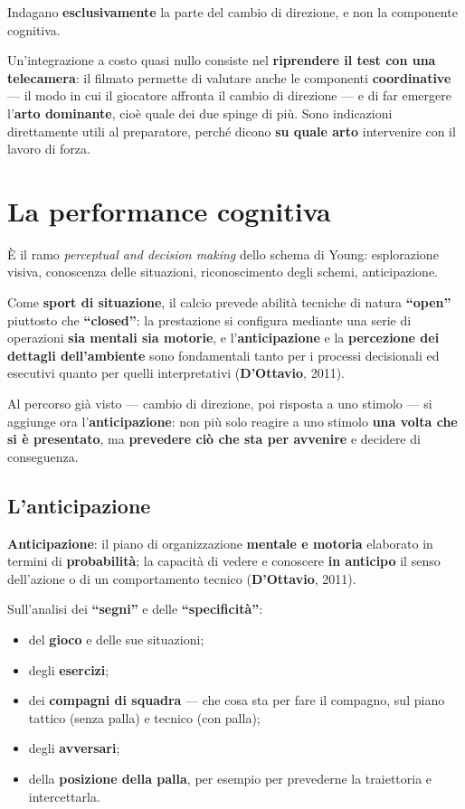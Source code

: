 Indagano \textbf{esclusivamente} la parte del cambio di direzione, e non la componente cognitiva.

Un'integrazione a costo quasi nullo consiste nel \textbf{riprendere il test con una telecamera}:
il filmato permette di valutare anche le componenti \textbf{coordinative} --- il modo in cui il
giocatore affronta il cambio di direzione --- e di far emergere l'\textbf{arto dominante}, cioè
quale dei due spinge di più. Sono indicazioni direttamente utili al preparatore, perché dicono
\textbf{su quale arto} intervenire con il lavoro di forza.

\section{La performance cognitiva}

È il ramo \textit{perceptual and decision making} dello schema di Young: esplorazione visiva,
conoscenza delle situazioni, riconoscimento degli schemi, anticipazione.

Come \textbf{sport di situazione}, il calcio prevede abilità tecniche di natura \textbf{``open''}
piuttosto che \textbf{``closed''}: la prestazione si configura mediante una serie di operazioni
\textbf{sia mentali sia motorie}, e l'\textbf{anticipazione} e la \textbf{percezione dei dettagli
dell'ambiente} sono fondamentali tanto per i processi decisionali ed esecutivi quanto per quelli
interpretativi (\textbf{D'Ottavio}, 2011).

Al percorso già visto --- cambio di direzione, poi risposta a uno stimolo --- si aggiunge ora
l'\textbf{anticipazione}: non più solo reagire a uno stimolo \textbf{una volta che si è
presentato}, ma \textbf{prevedere ciò che sta per avvenire} e decidere di conseguenza.

\subsection{L'anticipazione}

\textbf{Anticipazione}: il piano di organizzazione \textbf{mentale e motoria} elaborato in termini
di \textbf{probabilità}; la capacità di vedere e conoscere \textbf{in anticipo} il senso
dell'azione o di un comportamento tecnico (\textbf{D'Ottavio}, 2011).

Sull'analisi dei \textbf{``segni''} e delle \textbf{``specificità''}:
\begin{itemize}
  \item del \textbf{gioco} e delle sue situazioni;
  \item degli \textbf{esercizi};
  \item dei \textbf{compagni di squadra} --- che cosa sta per fare il compagno, sul piano tattico
    (senza palla) e tecnico (con palla);
  \item degli \textbf{avversari};
  \item della \textbf{posizione della palla}, per esempio per prevederne la traiettoria e
    intercettarla.
\end{itemize}

